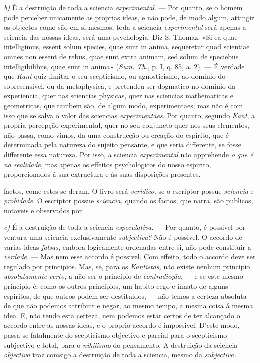 \emph{b)} É a destruição de toda a sciencia \emph{experimental}. --- Por quanto, se o homem pode perceber unicamente as proprias ideas, e não pode, de modo algum, attingir os objectos como são em si mesmos, toda a sciencia \emph{experimental} será apenas a sciencia das nossas ideas, será uma psychologia. Diz S. Thomaz: «Si ea quae intelligimus, essent solum species, quae sunt in anima, sequeretur quod scientiae omnes non essent de rebus, quae sunt extra animam, sed solum de speciebus intelligibilibus, quae sunt in anima» (\emph{Sum. Th.}, p. I, q. 85, a. 2). --- É verdade que \emph{Kant} quiz limitar o seu scepticismo, ou agnosticismo, ao dominio do sobresensivel, ou da metaphysica, e pretendeu ser dogmatico no dominio da experiencia, quer nas sciencias physicas, quer nas sciencias mathematicas e geometricas, que tambem são, de algum modo, experimentaes; mas não é com isso que se salva o valor das sciencias \emph{experimentaes}. Por quanto, segundo \emph{Kant}, a propria percepção experimental, quer no seu conjuncto quer nos seus elementos, não passa, como vimos, da uma construcção ou creação do espirito, que é determinada pela natureza do sujeito pensante, e que seria differente, se fosse differente essa natureza. Por isso, a sciencia \emph{experimental} não apprehende \emph{o que é na realidade}, mas apenas os effeitos psychologicos do nosso espirito, proporcionados á sua extructura e ás suas disposições presentes.

factos, come estes se deram. O livro será \emph{veridico,} se o escriptor possue \emph{sciencia} e \emph{probidade}. O escriptor possue \emph{sciencia,} quando os factos, que narra, são publicos, notaveis e observados por

\emph{c)} É a destruição de toda a sciencia \emph{especulativa.} --- Por quanto, é possivel por ventura uma sciencia exclusivamente \emph{subjectiva?} Não é possivel. O accordo de varias ideas \emph{falsas,} embora logicamente ordenadas entre si, não pode constituir a \emph{verdade.} --- Mas nem esse accordo é possivel. Com effeito, todo o accordo deve ser regulado por principios. Mas, se, para os \emph{Kantistas,} não existe nenhum principio \emph{absolutamente certo,} a não ser o principio de \emph{contradicção,} --- e se este mesmo principio é, como os outros principios, um habito cego e innato de alguns espiritos, de que outros podem ser destituidos, --- não temos a certeza absoluta de que não podemos attribuir e negar, ao mesmo tempo, a mesma coisa á mesma idea. E, não tendo esta certeza, nem podemos estar certos de ter alcançado o accordo entre as nossas ideas, e o proprio accordo é impossivel. D'este modo, passa-se fatalmente do scepticismo objectivo e parcial para o scepticismo subjectivo e total, para o \emph{nihilismo} do pensamento. A destruição da sciencia \emph{objectiva} traz comsigo a destruição de toda a sciencia, mesmo da \emph{subjectiva.}

